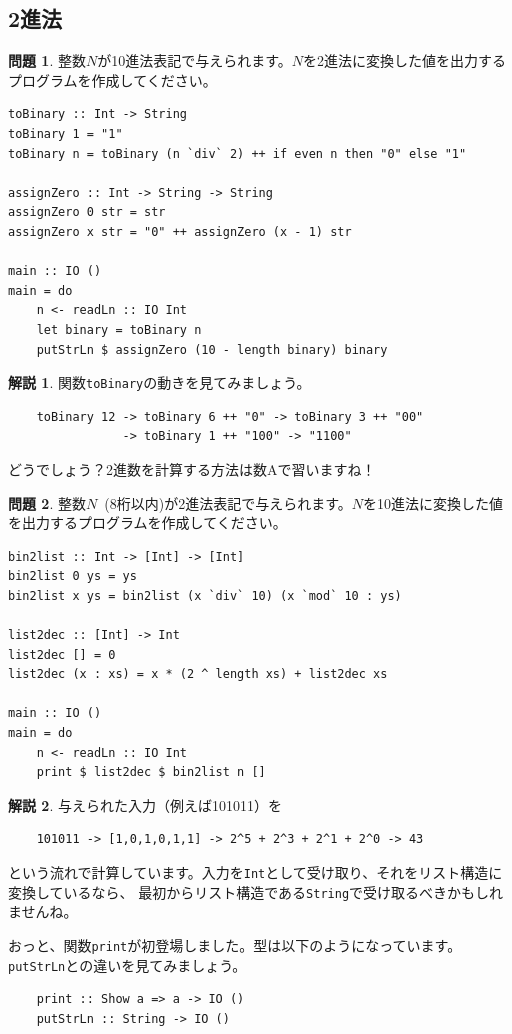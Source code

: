 \documentclass[12pt,a4paper,dvipdfmx,fleqn]{article}%
\theoremstyle{definition}
\newtheorem*{toi*}{問題}
\theoremstyle{definition}
\newtheorem*{ans*}{解説}
\theoremstyle{definition}
\begin{document}
\subsection{2進法}\label{2進法}
\begin{toi*}
    整数$N$が10進法表記で与えられます。$N$を2進法に変換した値を出力するプログラムを作成してください。
\end{toi*}
\begin{lstlisting}[caption=A04.hs,label=A04]
toBinary :: Int -> String
toBinary 1 = "1"
toBinary n = toBinary (n `div` 2) ++ if even n then "0" else "1"

assignZero :: Int -> String -> String
assignZero 0 str = str
assignZero x str = "0" ++ assignZero (x - 1) str

main :: IO ()
main = do
    n <- readLn :: IO Int
    let binary = toBinary n
    putStrLn $ assignZero (10 - length binary) binary
\end{lstlisting}
\begin{ans*}
    関数\texttt{toBinary}の動きを見てみましょう。
    \begin{verbatim}
    toBinary 12 -> toBinary 6 ++ "0" -> toBinary 3 ++ "00"
                -> toBinary 1 ++ "100" -> "1100"
    \end{verbatim}
    \vspace*{-4mm}
    どうでしょう？2進数を計算する方法は数Aで習いますね！
\end{ans*}
\begin{toi*}
    整数$N$~(8桁以内)が2進法表記で与えられます。$N$を10進法に変換した値を出力するプログラムを作成してください。
\end{toi*}
\begin{lstlisting}[caption=B04.hs,label=B04]
bin2list :: Int -> [Int] -> [Int]
bin2list 0 ys = ys
bin2list x ys = bin2list (x `div` 10) (x `mod` 10 : ys)

list2dec :: [Int] -> Int
list2dec [] = 0
list2dec (x : xs) = x * (2 ^ length xs) + list2dec xs

main :: IO ()
main = do
    n <- readLn :: IO Int
    print $ list2dec $ bin2list n []
\end{lstlisting}
\begin{ans*}
    与えられた入力（例えば101011）を
    \begin{verbatim}
    101011 -> [1,0,1,0,1,1] -> 2^5 + 2^3 + 2^1 + 2^0 -> 43
    \end{verbatim}
    \vspace*{-4mm}
    という流れで計算しています。入力を\texttt{Int}として受け取り、それをリスト構造に変換しているなら、
    最初からリスト構造である\texttt{String}で受け取るべきかもしれませんね。\par
    おっと、関数\texttt{print}が初登場しました。型は以下のようになっています。
    \texttt{putStrLn}との違いを見てみましょう。
    \begin{verbatim}
    print :: Show a => a -> IO ()
    putStrLn :: String -> IO ()
    \end{verbatim}
    \vspace*{-4mm}
\end{ans*}
\end{document}
